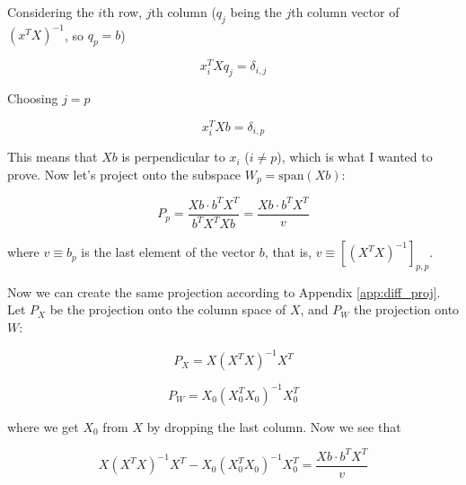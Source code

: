 \documentclass{article}
\begin{document}
\begin{appendices}
Considering the $i$th row, $j$th column ($q_j$ being the $j$th column vector of $(x^TX)^{-1}$, so $q_p = b$)

\begin{equation}
    x^T_i X q_j = \delta_{i,j}
\end{equation}

Choosing $j=p$

\begin{equation}
    x^T_i X b = \delta_{i,p}
\end{equation}

This means that $Xb$ is perpendicular to $x_i$ ($i \neq p$), which is what I wanted to prove. Now let's project onto the subspace $W_p = \text{span}(Xb)$:

\begin{equation}
    P_{p} = \frac{Xb\cdot b^TX^T}{b^TX^TXb} = \frac{Xb\cdot b^TX^T}{v}
\end{equation}

where $v \equiv b_p$ is the last element of the vector $b$, that is, $v\equiv [(X^TX)^{-1}]_{p,p}$.

Now we can create the same projection according to Appendix \ref{app:diff_proj}. Let $P_X$ be the projection onto the column space of $X$, and $P_W$ the projection onto $W$:

\begin{equation}
    P_X = X (X^TX)^{-1} X^T
\end{equation}

\begin{equation}
    P_W = X_0 (X^T_0 X_0)^{-1} X^T_0
\end{equation}

where we get $X_0$ from $X$ by dropping the last column. Now we see that

\begin{equation}
    X (X^TX)^{-1} X^T - X_0 (X^T_0 X_0)^{-1} X^T_0 = \frac{Xb\cdot b^TX^T}{v}
\end{equation}

\end{appendices}
\end{document}
